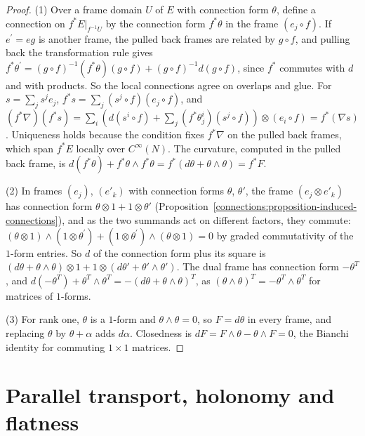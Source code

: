 \begin{proof}
(1) Over a frame domain $U$ of $E$ with connection form $\theta$, define a connection on $f^*E|_{f^{-1}U}$ by the connection form $f^*\theta$ in the frame $(e_j \circ f)$. If
$e^{\prime} = eg$ is another frame, the pulled back frames are related by $g \circ f$, and pulling back the transformation rule gives
$f^*\theta^{\prime} = (g \circ f)^{-1}(f^*\theta)(g \circ f) + (g \circ f)^{-1}d(g \circ f)$, since $f^*$ commutes with $d$ and with products. So the local connections agree on overlaps
and glue. For $s = \sum_js^je_j$, $f^*s = \sum_j(s^j \circ f)(e_j \circ f)$, and $(f^*\nabla)(f^*s) = \sum_i(d(s^i \circ f) + \sum_j(f^*\theta^i_j)(s^j \circ f)) \otimes (e_i \circ f)
= f^*(\nabla s)$. Uniqueness holds because the condition fixes $f^*\nabla$ on the pulled back frames, which span $f^*E$ locally over $C^\infty(N)$. The curvature, computed in the
pulled back frame, is $d(f^*\theta) + f^*\theta \wedge f^*\theta = f^*(d\theta + \theta \wedge \theta) = f^*F$.

(2) In frames $(e_j)$, $(e'_k)$ with connection forms $\theta$, $\theta'$, the frame $(e_j \otimes e'_k)$ has connection form $\theta \otimes 1 + 1 \otimes \theta'$
(Proposition~\ref{connections:proposition-induced-connections}), and as the two summands act on different factors, they commute:
$(\theta \otimes 1) \wedge (1 \otimes \theta^{\prime}) + (1 \otimes \theta^{\prime}) \wedge (\theta \otimes 1) = 0$ by graded commutativity of the $1$-form entries. So $d$ of the connection form plus its
square is $(d\theta + \theta \wedge \theta) \otimes 1 + 1 \otimes (d\theta' + \theta' \wedge \theta')$. The dual frame has connection form $-\theta^T$, and
$d(-\theta^T) + \theta^T \wedge \theta^T = -(d\theta + \theta \wedge \theta)^T$, as $(\theta \wedge \theta)^T = -\theta^T \wedge \theta^T$ for matrices of $1$-forms.

(3) For rank one, $\theta$ is a $1$-form and $\theta \wedge \theta = 0$, so $F = d\theta$ in every frame, and replacing $\theta$ by $\theta + \alpha$ adds $d\alpha$. Closedness is $dF = F \wedge \theta - \theta \wedge F = 0$, the
Bianchi identity for commuting $1 \times 1$ matrices.
\end{proof}

\section{Parallel transport, holonomy and flatness}\label{connections:section-parallel-transport}

